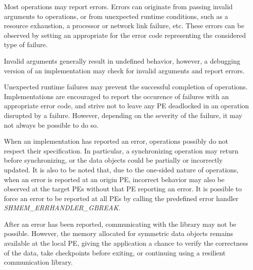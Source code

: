 Most \openshmem operations may report errors. Errors can originate from
passing invalid arguments to \openshmem operations, or from
unexpected runtime conditions, such as a resource exhaustion, a processor
or network link failure, etc. These errors can be observed by setting an
appropriate  for the error code representing the
considered type of failure.

Invalid arguments generally result in undefined behavior, however, a
debugging version of an \openshmem implementation may check for invalid
arguments and report errors.

Unexpected runtime failures may prevent the successful completion of \openshmem
operations. Implementations are encouraged to report the occurence of failures
with an appropriate error code, and strive not to leave any \ac{PE} deadlocked
in an operation disrupted by a failure. However, depending on the severity of
the failure, it may not always be possible to do so.

When an \openshmem implementation has reported an error, operations possibly do
not respect their specification. In particular, a synchronizing operation may
return before synchronizing, or the data objects could be partially
or incorrectly updated. It is also to be noted that, due to the one-sided
nature of \openshmem operations, when an error is reported at
an origin \ac{PE}, incorrect behavior may also be observed at
the target \acp{PE} without that \ac{PE} reporting an error. It is possible
to force an error to be reported at all \acp{PE} by calling the predefined
error handler \textit{SHMEM\_ERRHANDLER\_GBREAK}.

After an error has been reported, communicating with the \openshmem
library may not be possible. However, the memory allocated for
symmetric data objects remains available at the local \ac{PE}, giving the
application a chance to verify the correctness of the data, take checkpoints
before exiting, or continuing using a resilient communication library.
